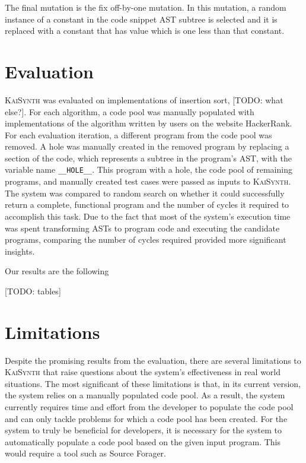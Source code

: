 \documentclass{article}
\begin{document}
The final mutation is the fix off-by-one mutation. In this mutation, a random instance of a constant in the code snippet AST subtree is selected and it is replaced with a constant that has value which is one less than that constant. 


\section{Evaluation}

\textsc{KaiSynth} was evaluated on implementations of insertion sort, [TODO: what else?]. For each algorithm, a code pool was manually populated with implementations of the algorithm written by users on the website HackerRank. For each evaluation iteration, a different program from the code pool was removed. A hole was manually created in the removed program by replacing a section of the code, which represents a subtree in the program's AST, with the variable name \texttt{\_\_HOLE\_\_}. This program with a hole, the code pool of remaining programs, and manually created test cases were passed as inputs to \textsc{KaiSynth}. The system was compared to random search on whether it could successfully return a complete, functional program and the number of cycles it required to accomplish this task. Due to the fact that most of the system's execution time was spent transforming ASTs to program code and executing the candidate programs, comparing the number of cycles required provided more significant insights.

Our results are the following

[TODO: tables]


\section{Limitations}

Despite the promising results from the evaluation, there are several limitations to \textsc{KaiSynth} that raise questions about the system's effectiveness in real world situations. The most significant of these limitations is that, in its current version, the system relies on a manually populated code pool. As a result, the system currently requires time and effort from the developer to populate the code pool and can only tackle problems for which a code pool has been created. For the system to truly be beneficial for developers, it is necessary for the system to automatically populate a code pool based on the given input program. This would require a tool such as Source Forager.
\end{document}
